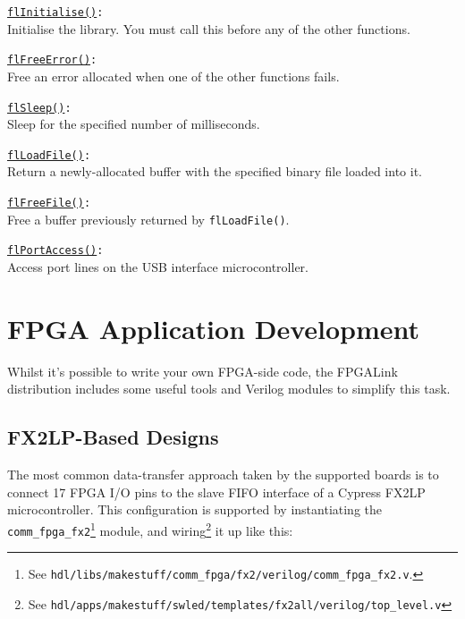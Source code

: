 \begin{desc}
  \item[\texttt{\href{http://www.swaton.ukfsn.org/bin/fpgalink-MAKESTUFF_TODAY_DATE/api/libfpgalink\_8h.html\#a973de7f601138a3e3bb8f6e184ee9be8}{flInitialise()}:}] \hfill \\
    Initialise the library. You must call this before any of the other functions.
  \item[\texttt{\href{http://www.swaton.ukfsn.org/bin/fpgalink-MAKESTUFF_TODAY_DATE/api/libfpgalink\_8h.html\#a313f24c559a56d12518cb1e7eacdf01b}{flFreeError()}:}] \hfill \\
    Free an error allocated when one of the other functions fails.
  \item[\texttt{\href{http://www.swaton.ukfsn.org/bin/fpgalink-MAKESTUFF_TODAY_DATE/api/libfpgalink\_8h.html\#a58a48f47195b55d4921659a74d9eed5d}{flSleep()}:}] \hfill \\
    Sleep for the specified number of milliseconds.
  \item[\texttt{\href{http://www.swaton.ukfsn.org/bin/fpgalink-MAKESTUFF_TODAY_DATE/api/libfpgalink\_8h.html\#ad2fd61ccae8632d5fa180d0c468257fb}{flLoadFile()}:}] \hfill \\
    Return a newly-allocated buffer with the specified binary file loaded into it.
  \item[\texttt{\href{http://www.swaton.ukfsn.org/bin/fpgalink-MAKESTUFF_TODAY_DATE/api/libfpgalink\_8h.html\#a17909597ec81d8610c791a1ebf5f1400}{flFreeFile()}:}] \hfill \\
    Free a buffer previously returned by \texttt{flLoadFile()}.
  \item[\texttt{\href{http://www.swaton.ukfsn.org/bin/fpgalink-MAKESTUFF_TODAY_DATE/api/libfpgalink\_8h.html\#ac7c58e9d3084a9367498b9576fca2805}{flPortAccess()}:}] \hfill \\
    Access port lines on the USB interface microcontroller.
\end{desc}

\newpage
\section{FPGA Application Development}
Whilst it's possible to write your own FPGA-side code, the FPGALink distribution includes some useful tools and Verilog modules to simplify this task.

\subsection{FX2LP-Based Designs}
The most common data-transfer approach taken by the supported boards is to connect 17 FPGA I/O pins to the slave FIFO interface of a Cypress FX2LP microcontroller. This configuration is supported by instantiating the \texttt{comm\_fpga\_fx2}\footnote{See \texttt{hdl/libs/makestuff/comm\_fpga/fx2/verilog/comm\_fpga\_fx2.v}.} module, and wiring\footnote{See \texttt{hdl/apps/makestuff/swled/templates/fx2all/verilog/top\_level.v}} it up like this:

